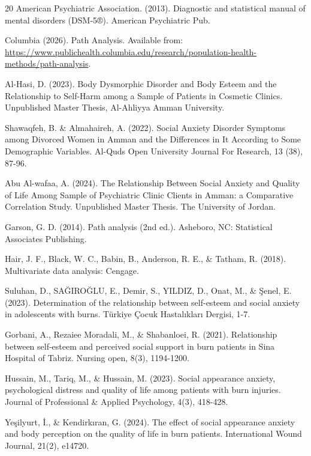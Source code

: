 \documentclass[10pt]{NSP1}
\begin{document}
\begin{thebibliography}{20}
		 American Psychiatric Association. (2013). Diagnostic and statistical manual of mental disorders (DSM-5®). American Psychiatric Pub.
		
		 Columbia (2026). Path Analysis. Available from: \url{https://www.publichealth.columbia.edu/research/population-health-methods/path-analysis}.
		
		 Al-Hasi, D. (2023). Body Dysmorphic Disorder and Body Esteem and the Relationship to Self-Harm among a Sample of Patients in Cosmetic Clinics. Unpublished Master Thesis, Al-Ahliyya Amman University.
		
		 Shawaqfeh, B. \& Almahaireh, A. (2022). Social Anxiety Disorder Symptoms among Divorced Women in Amman and the Differences in It According to Some Demographic Variables. Al-Quds Open University Journal For Research, 13 (38), 87-96.
		
		 Abu Al-wafaa, A. (2024). The Relationship Between Social Anxiety and Quality of Life Among Sample of Psychiatric Clinic Clients in Amman: a Comparative Correlation Study. Unpublished Master Thesis. The University of Jordan.
		
		 Garson, G. D. (2014). Path analysis (2nd ed.). Asheboro, NC: Statistical Associates Publishing.
		
		 Hair, J. F., Black, W. C., Babin, B., Anderson, R. E., \& Tatham, R. (2018). Multivariate data analysis: Cengage.
		
		 Suluhan, D., SAĞIROĞLU, E., Demir, S., YILDIZ, D., Onat, M., \& Şenel, E. (2023). Determination of the relationship between self-esteem and social anxiety in adolescents with burns. Türkiye Çocuk Hastalıkları Dergisi, 1-7.
		
		 Gorbani, A., Rezaiee Moradali, M., \& Shabanloei, R. (2021). Relationship between self‐esteem and perceived social support in burn patients in Sina Hospital of Tabriz. Nursing open, 8(3), 1194-1200.
		
		 Hussain, M., Tariq, M., \& Hussain, M. (2023). Social appearance anxiety, psychological distress and quality of life among patients with burn injuries. Journal of Professional \& Applied Psychology, 4(3), 418-428.
		
		 Yeşilyurt, İ., \& Kendirkıran, G. (2024). The effect of social appearance anxiety and body perception on the quality of life in burn patients. International Wound Journal, 21(2), e14720.
		
	\end{thebibliography}
	
\end{document}

